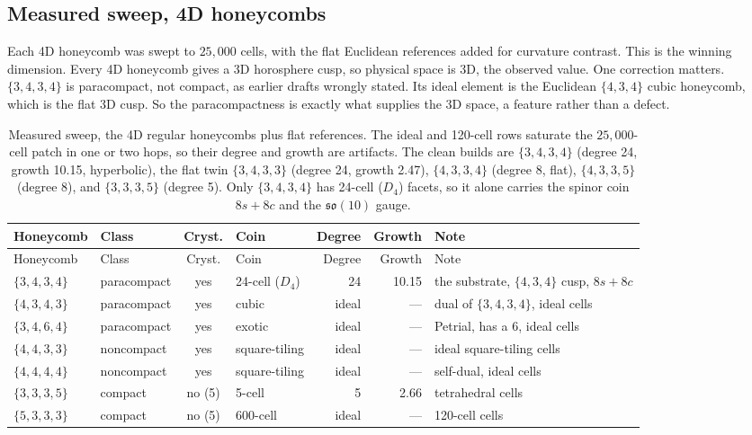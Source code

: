 \subsection{Measured sweep, 4D honeycombs}

Each 4D honeycomb was swept to $25{,}000$ cells, with the flat Euclidean references added for curvature contrast.
This is the winning dimension. Every 4D honeycomb gives a 3D horosphere cusp, so physical space is 3D, the
observed value. One correction matters. $\{3,4,3,4\}$ is paracompact, not compact, as earlier drafts wrongly
stated. Its ideal element is the Euclidean $\{4,3,4\}$ cubic honeycomb, which is the flat 3D cusp. So the
paracompactness is exactly what supplies the 3D space, a feature rather than a defect.

{\small
\begin{longtable}{l p{0.85in} c l r r p{1.7in}}
\caption{Measured sweep, the 4D regular honeycombs plus flat references. The ideal and 120-cell rows saturate the
$25{,}000$-cell patch in one or two hops, so their degree and growth are artifacts. The clean builds are
$\{3,4,3,4\}$ (degree 24, growth 10.15, hyperbolic), the flat twin $\{3,4,3,3\}$ (degree 24, growth 2.47),
$\{4,3,3,4\}$ (degree 8, flat), $\{4,3,3,5\}$ (degree 8), and $\{3,3,3,5\}$ (degree 5). Only $\{3,4,3,4\}$ has
24-cell ($D_4$) facets, so it alone carries the spinor coin $8s + 8c$ and the $\mathfrak{so}(10)$ gauge.}
\label{tab:sweep-4d}\\
\toprule
Honeycomb & Class & Cryst. & Coin & Degree & Growth & Note \\
\midrule
\endfirsthead
\toprule
Honeycomb & Class & Cryst. & Coin & Degree & Growth & Note \\
\midrule
\endhead
\bottomrule
\endfoot
$\{3,4,3,4\}$ & paracompact & yes & 24-cell ($D_4$) & 24 & 10.15 & the substrate, $\{4,3,4\}$ cusp, $8s+8c$ \\
$\{4,3,4,3\}$ & paracompact & yes & cubic & ideal & --- & dual of $\{3,4,3,4\}$, ideal cells \\
$\{3,4,6,4\}$ & paracompact & yes & exotic & ideal & --- & Petrial, has a 6, ideal cells \\
$\{4,4,3,3\}$ & noncompact & yes & square-tiling & ideal & --- & ideal square-tiling cells \\
$\{4,4,4,4\}$ & noncompact & yes & square-tiling & ideal & --- & self-dual, ideal cells \\
$\{3,3,3,5\}$ & compact & no (5) & 5-cell & 5 & 2.66 & tetrahedral cells \\
$\{5,3,3,3\}$ & compact & no (5) & 600-cell & ideal & --- & 120-cell cells \\

\end{longtable}}
